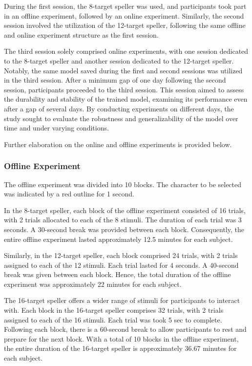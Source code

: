 During the first session, the 8-target speller was used, and participants took part in an offline experiment, followed by an online experiment. Similarly, the second session involved the utilization of the 12-target speller, following the same offline and online experiment structure as the first session.

The third session solely comprised online experiments, with one session dedicated to the 8-target speller and another session dedicated to the 12-target speller. Notably, the same model saved during the first and second sessions was utilized in the third session. After a minimum gap of one day following the second session, participants proceeded to the third session. This session aimed to assess the durability and stability of the trained model, examining its performance even after a gap of several days. By conducting experiments on different days, the study sought to evaluate the robustness and generalizability of the model over time and under varying conditions.

Further elaboration on the online and offline experiments is provided below.

\subsubsection{Offline Experiment}
The offline experiment was divided into 10 blocks. The character to be selected was indicated by a red outline for 1 second. 

In the 8-target speller, each block of the offline experiment consisted of 16 trials, with 2 trials allocated to each of the 8 stimuli. The duration of each trial was 3 seconds. A 30-second break was provided between each block. Consequently, the entire offline experiment lasted approximately 12.5 minutes for each subject.

Similarly, in the 12-target speller, each block comprised 24 trials, with 2 trials assigned to each of the 12 stimuli. Each trial lasted for 4 seconds. A 40-second break was given between each block. Hence, the total duration of the offline experiment was approximately 22 minutes for each subject.

The 16-target speller offers a wider range of stimuli for participants to interact with. Each block in the 16-target speller comprises 32 trials, with 2 trials assigned to each of the 16 stimuli. Each trial was took 5 sec to complete. Following each block, there is a 60-second break to allow participants to rest and prepare for the next block. With a total of 10 blocks in the offline experiment, the entire duration of the 16-target speller is approximately 36.67 minutes for each subject. 


